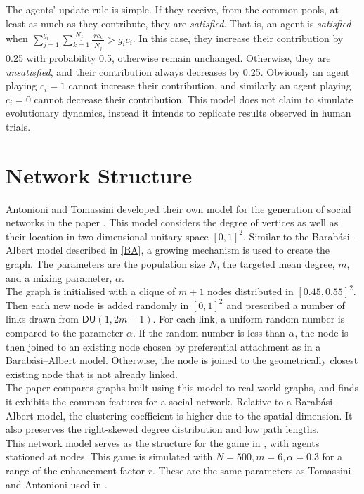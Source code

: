 The agents' update rule is simple. If they receive, from the common pools, at least as much as they contribute, they are \emph{satisfied}. That is, an agent is \emph{satisfied} when $\sum_{j=1}^{g_i} \sum_{k=1}^{|N_j|} \frac{rc_k}{|N_j|}>g_i c_i$. In this case, they increase their contribution by 0.25 with probability 0.5, otherwise remain unchanged. Otherwise, they are \emph{unsatisfied}, and their contribution always decreases by 0.25. Obviously an agent playing $c_i =1$ cannot increase their contribution, and similarly an agent playing $c_i=0$ cannot decrease their contribution. This model does not claim to simulate evolutionary dynamics, instead it intends to replicate results observed in human trials. \\


\section{Network Structure}
Antonioni and Tomassini developed their own model for the generation of social networks in the paper \cite{RN51}. This model considers the degree of vertices as well as their location in two-dimensional unitary space $[0,1]^2$. Similar to the Barab\'{a}si--Albert model described in \ref{BA}, a growing mechanism is used to create the graph. The parameters are  the population size $N$, the targeted mean degree, $m$, and  a mixing parameter, $\alpha$. \\

The graph is initialised with a clique of $m+1$ nodes distributed in $[0.45, 0.55]^2$. Then each new node is added randomly in $[0,1]^2$ and prescribed a number of links drawn from $\mathsf{DU}(1,2m-1)$. For each link, a uniform random number is compared to the parameter $\alpha$. If the random number is less than $\alpha$, the node is then joined to an existing node chosen by preferential attachment as in a Barab\'{a}si--Albert model. Otherwise, the node is joined to the geometrically closest existing node that is not already linked. \\

The paper \cite{RN51} compares graphs built using this model to real-world graphs, and finds it exhibits the common features for a social network. Relative to a Barab\'{a}si--Albert model, the clustering coefficient is higher due to the spatial dimension. It also preserves the right-skewed degree distribution and low path lengths. \\

This network model serves as the structure for the game in \cite{RN49}, with agents stationed at nodes. This game is simulated with $N=500, m = 6, \alpha = 0.3$ for a range of the enhancement factor $r$. These are the same parameters as Tomassini and Antonioni used in \cite{RN49}. \\

